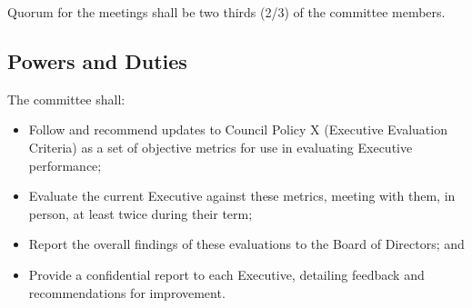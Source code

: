 Quorum for the meetings shall be two thirds (2/3) of the committee members.

\subsection{Powers and Duties}

The committee shall:
\begin{itemize}
    \item Follow and recommend updates to Council Policy X (Executive
        Evaluation Criteria) as a set of objective metrics for use in
        evaluating Executive performance;
    \item Evaluate the current Executive against these metrics, meeting with
        them, in person, at least twice during their term;
    \item Report the overall findings of these evaluations to the Board of
        Directors; and
    \item Provide a confidential report to each Executive, detailing feedback
        and recommendations for improvement.
        
\end{itemize}
